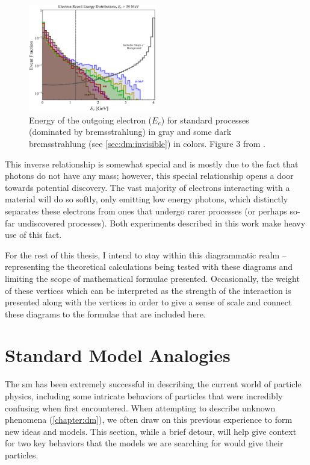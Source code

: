 \begin{figure}
	\centering
	\includegraphics[width=0.5\textwidth]{figures/intro/photon-reject-fig-3-recoil-electron-energy.png}
	\caption{
		Energy of the outgoing electron ($E_e$) for standard processes (dominated by bremsstrahlung)
		in gray and some dark bremsstrahlung (see \cref{sec:dm:invisible}) in colors.
		Figure 3 from \cite{ldmx-photon-reject-2020}.
	}
	\label{fig:recoil-electron-energy}
\end{figure}

This inverse relationship is somewhat special and is mostly due to the fact that photons
do not have any mass; however, this special relationship opens a door towards potential
discovery. The vast majority of electrons interacting with a material will do so softly,
only emitting low energy photons, which distinctly separates these electrons from ones
that undergo rarer processes (or perhaps so-far undiscovered processes). Both experiments
described in this work make heavy use of this fact.

For the rest of this thesis, I intend to stay within this diagrammatic realm -- representing the theoretical
calculations being tested with these diagrams and limiting the scope of mathematical formulae
presented. Occasionally, the weight of these vertices which can be interpreted as the strength
of the interaction is presented along with the vertices in order to give a sense of scale
and connect these diagrams to the formulae that are included here.

\section{Standard Model Analogies}
The \ac{sm} has been extremely successful in describing the current world of particle physics,
including some intricate behaviors of particles that were incredibly confusing when first
encountered.
When attempting to describe unknown phenomena (\cref{chapter:dm}), we often draw on this
previous experience to form new ideas and models.
This section, while a brief detour, will help give context for two key behaviors that
the models we are searching for would give their particles.

